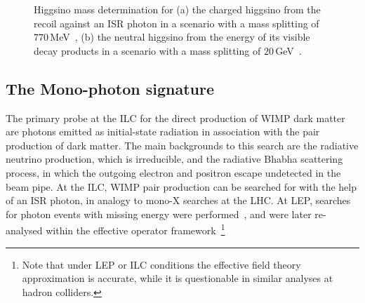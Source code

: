 \begin{figure}[]
  \begin{center}
    \hspace{0.05\linewidth}
  \end{center}
  \caption{\label{fig:searches_higgsinos} Higgsino mass determination for (a) the charged higgsino from the recoil against an ISR photon in a scenario with a mass splitting of $770$\,MeV~\cite{Berggren:2013vfa}, (b) the neutral higgsino from the energy of its visible decay products in a scenario with a mass splitting of  $20$\,GeV~\cite{Baer:2016new}. }
\end{figure}



\subsection{The Mono-photon signature}
\label{subsec:searches_monophoton}

The primary probe at the ILC for the direct production of WIMP dark matter are photons
emitted as initial-state radiation in association with the pair production of dark matter.
The main backgrounds to this search are the radiative neutrino production, which is irreducible,
and the radiative Bhabha scattering process, in which the outgoing electron and positron escape 
undetected in the beam pipe.
At the ILC, WIMP pair production can be searched for with the help of an ISR photon, 
in analogy to mono-X searches at the LHC.
At LEP, searches for photon events with missing energy were performed~\cite{Abdallah:2003np,*Abdallah:2008aa},
and were later re-analysed within the  effective
operator framework~\cite{Fox:2011fx}\footnote{Note that under LEP or ILC conditions the 
effective field theory approximation is accurate, while it is questionable
in similar analyses at hadron colliders. 
}

